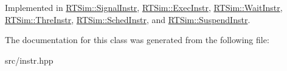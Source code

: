 Implemented in \hyperlink{classRTSim_1_1SignalInstr_a4ffd013ebb12852ee32ce78302013965}{R\+T\+Sim\+::\+Signal\+Instr}, \hyperlink{classRTSim_1_1ExecInstr_ac3ee1947f5bc6d19f0283b6fc8881dae}{R\+T\+Sim\+::\+Exec\+Instr}, \hyperlink{classRTSim_1_1WaitInstr_a7a4235cc598f6d042786cd1af29ceecb}{R\+T\+Sim\+::\+Wait\+Instr}, \hyperlink{classRTSim_1_1ThreInstr_a206e77229d59ee9e6bbdebd2cf6707ce}{R\+T\+Sim\+::\+Thre\+Instr}, \hyperlink{classRTSim_1_1SchedInstr_a85b99b66167703c31c640fd9de989511}{R\+T\+Sim\+::\+Sched\+Instr}, and \hyperlink{classRTSim_1_1SuspendInstr_a0985c042f0472b5274e826dd08b0ee09}{R\+T\+Sim\+::\+Suspend\+Instr}.



The documentation for this class was generated from the following file\+:\begin{DoxyCompactItemize}
\item 
src/instr.\+hpp\end{DoxyCompactItemize}
